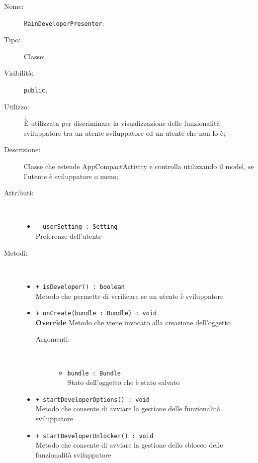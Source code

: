 \documentclass[../DefinizioneDiProdotto.tex]{subfiles}
\begin{document}
\begin{description}
	\item[Nome:] \texttt{MainDeveloperPresenter};
	\item[Tipo:] Classe;
	\item[Visibilità:] \texttt{public};
	\item[Utilizzo:] È utilizzata per discriminare la visualizzazione delle funzionalità sviluppatore tra un utente sviluppatore ed un utente che non lo è;
	\item[Descrizione:] Classe che estende AppCompactActivity e controlla utilizzando il model, se l'utente è sviluppatore o meno;
	\item[Attributi:] \
	\begin{itemize}
		\item \texttt{- userSetting : Setting}\\
		Preferenze dell'utente
		
	\end{itemize}
	\item[Metodi:] \
	\begin{itemize}
		\item \texttt{+ isDeveloper() : boolean}\\
		Metodo che permette di verificare se un utente è sviluppatore
		\item \texttt{+ onCreate(bundle : Bundle) : void}\\
		\textbf{Override} Metodo che viene invocato alla creazione dell'oggetto
		\begin{description}
			\item[Argomenti:] \
			\begin{itemize}
				\item \texttt{bundle : Bundle}\\
				Stato dell'oggetto che è stato salvato\end{itemize}
		\end{description}
		\item \texttt{+ startDeveloperOptions() : void}\\
		Metodo che consente di avviare la gestione delle funzionalità sviluppatore
		\item \texttt{+ startDeveloperUnlocker() : void}\\
		Metodo che consente di avviare la gestione dello sblocco delle funzionalità sviluppatore
	\end{itemize}
\end{description}
\end{document}
